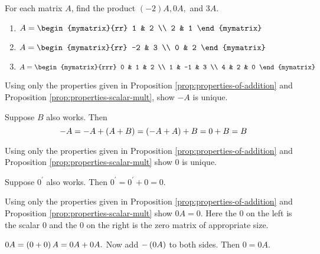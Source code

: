 \begin{enumialphparenastyle}

\begin{ex} For each matrix $A$, find the product $(-2)A, 0A,$ and $3A$. 
\begin{enumerate}
\item
$A = \begin{mymatrix}{rr}
1 & 2 \\
2 & 1 
\end{mymatrix}$

\item
$A = \begin{mymatrix}{rr}
-2 & 3 \\
0 & 2 
\end{mymatrix}$

\item
$A = \begin{mymatrix}{rrr}
0 & 1 & 2 \\
1 & -1 & 3 \\
4 & 2 & 0 
\end{mymatrix}$
\end{enumerate}
\end{ex}

\begin{ex} \label{add-inv-rst-unique} Using only the properties given in Proposition \ref{prop:properties-of-addition}
 and Proposition \ref{prop:properties-scalar-mult}, 
show $-A$ is unique.
\begin{sol}
 Suppose $B$ also works. Then
\[
-A=-A+\left(A+B\right) =\left(-A+A\right) +B=0+B=B
\]
\end{sol}
\end{ex}

\begin{ex} Using only the properties given in Proposition \ref{prop:properties-of-addition} 
and Proposition \ref{prop:properties-scalar-mult}
show $0$ is unique. 
\begin{sol}
Suppose $0^{\prime }$ also works. Then $0^{\prime }=0^{\prime }+0=0.$
\end{sol}
\end{ex}

\begin{ex} Using only the properties given in Proposition \ref{prop:properties-of-addition}
 and Proposition \ref{prop:properties-scalar-mult} show $0A=0.$ Here
the $0$ on the left is the scalar $0$ and the $0$ on the right is the zero matrix of appropriate size.
\begin{sol}
$0A=\left(0+0\right) A=0A+0A.$ Now add $-\left(
0A\right) $ to both sides. Then $0=0A$.
\end{sol}
\end{ex}


\end{enumialphparenastyle}

